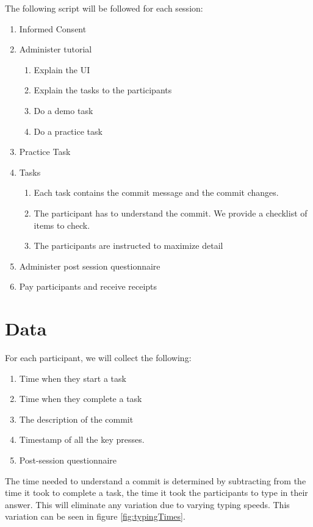 \documentclass[letterpaper]{article}
\begin{document}
The following script will be followed for each session:
\begin{enumerate}
	\item Informed Consent
	\item Administer tutorial
	\begin{enumerate}
		\item Explain the UI
		\item Explain the tasks to the participants
		\item Do a demo task
		\item Do a practice task
	\end{enumerate}
	\item Practice Task
	\item Tasks
	\begin{enumerate}
		\item Each task contains the commit message and the commit changes.
		\item The participant has to understand the commit. We provide a checklist of items to check.
		\item The participants are instructed to maximize detail
	\end{enumerate}
	\item Administer post session questionnaire
	\item Pay participants and receive receipts 
\end{enumerate}

\section{Data}

For each participant, we will collect the following:
\begin{enumerate}
	\item Time when they start a task
	\item Time when they complete a task
	\item The description of the commit
	\item Timestamp of all the key presses.
	\item Post-session questionnaire
\end{enumerate}

The time needed to understand a commit is determined by subtracting from the time it took to complete a task, the time it took the participants to type in their answer.
This will eliminate any variation due to varying typing speeds.
This variation can be seen in figure \ref{fig:typingTimes}.
\end{document}
